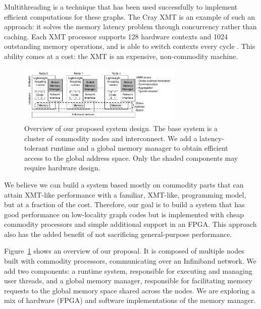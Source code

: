 \documentclass[10pt,nocopyrightspace,preprint]{sigplanconf}
\begin{document}
Multithreading is a technique that has been used successfully to
implement efficient computations for these graphs. The Cray XMT is an
example of such an approach: it solves the memory latency problem
through concurrency rather than caching. Each XMT processor supports
128 hardware contexts and 1024 outstanding memory operations, and is
able to switch contexts every cycle \cite{tera, feo-xmt}. This ability
comes at a cost: the XMT is an expensive, non-commodity
machine.

\begin{figure}[htbp]
  \begin{center}
    \vspace{-0.25in}
    \includegraphics[width=0.7\textwidth]{figures/system-overview.pdf}
    \vspace{-0.1in}
	\end{center}
	\caption{Overview of our proposed system design. The base
          system is a cluster of commodity nodes and interconnect. We
          add a latency-tolerant runtime and a global memory manager
          to obtain efficient access to the global address space. Only
          the shaded components may require hardware design.}
	\label{fig:system-overview}
\end{figure}


We believe we can build a system based mostly on commodity parts that
can attain XMT-like performance with a familiar, XMT-like,
programming model, but at a fraction of the cost. Therefore, our goal
is to build a system that has good performance on low-locality graph
codes but is implemented with cheap commodity processors and simple
additional support in an FPGA. This approach also has the added
benefit of not sacrificing general-purpose performance.

Figure~\ref{fig:system-overview} shows an overview of our proposal. It
is composed of multiple nodes built with commodity processors,
communicating over an Infiniband network. We add two components: a
runtime system, responsible for executing and managing user threads,
and a global memory manager, responsible for facilitating memory
requests to the global memory space shared across the nodes.
We are exploring a mix of hardware (FPGA) and software implementations
of the memory manager.
 
\end{document}
